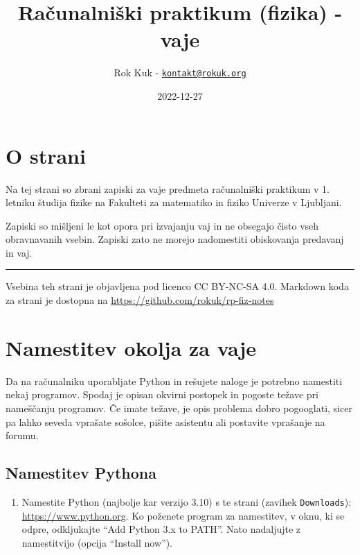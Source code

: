 \documentclass[
]{report}
\title{Računalniški praktikum (fizika) - vaje}
\author{Rok Kuk - \href{mailto:kontakt@rokuk.org}{\nolinkurl{kontakt@rokuk.org}}}
\date{2022-12-27}
\providecommand{\tightlist}{%
  \setlength{\itemsep}{0pt}\setlength{\parskip}{0pt}}
\begin{document}
\maketitle

{
\setcounter{tocdepth}{1}
\tableofcontents
}
\hypertarget{o-strani}{%
\chapter*{O strani}\label{o-strani}}

Na tej strani so zbrani zapiski za vaje predmeta računalniški praktikum v 1. letniku študija fizike na Fakulteti za matematiko in fiziko Univerze v Ljubljani.

Zapiski so mišljeni le kot opora pri izvajanju vaj in ne obsegajo čisto vseh obravnavanih vsebin. Zapiski zato ne morejo nadomestiti obiskovanja predavanj in vaj.

\begin{center}\rule{0.5\linewidth}{0.5pt}\end{center}

Vsebina teh strani je objavljena pod licenco CC BY-NC-SA 4.0.
Markdown koda za strani je dostopna na \url{https://github.com/rokuk/rp-fiz-notes}

\hypertarget{namestitev-okolja-za-vaje}{%
\chapter{Namestitev okolja za vaje}\label{namestitev-okolja-za-vaje}}

Da na računalniku uporabljate Python in rešujete naloge je potrebno namestiti
nekaj programov. Spodaj je opisan okvirni postopek in pogoste težave pri nameščanju
programov. Če imate težave, je opis problema dobro pogooglati, sicer pa lahko seveda vprašate sošolce, pišite
asistentu ali postavite vprašanje na forumu.

\hypertarget{namestitev-pythona}{%
\section{Namestitev Pythona}\label{namestitev-pythona}}

\begin{enumerate}
\def\labelenumi{\arabic{enumi}.}
\tightlist
\item
  Namestite Python (najbolje kar verzijo 3.10) s te strani (zavihek \texttt{Downloads}): \url{https://www.python.org}. Ko poženete program za namestitev, v oknu, ki se odpre, odkljukajte ``Add Python 3.x to PATH''. Nato nadaljujte z namestitvijo (opcija ``Install now'').
\end{enumerate}
\end{document}
